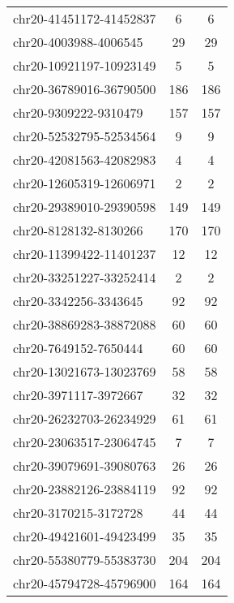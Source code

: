 \begin{longtable}{lSS}
	chr20-41451172-41452837 & 6      & 6                           \\
	chr20-4003988-4006545   & 29     & 29                          \\
	chr20-10921197-10923149 & 5      & 5                           \\
	chr20-36789016-36790500 & 186    & 186                         \\
	chr20-9309222-9310479   & 157    & 157                         \\
	chr20-52532795-52534564 & 9      & 9                           \\
	chr20-42081563-42082983 & 4      & 4                           \\
	chr20-12605319-12606971 & 2      & 2                           \\
	chr20-29389010-29390598 & 149    & 149                         \\
	chr20-8128132-8130266   & 170    & 170                         \\
	chr20-11399422-11401237 & 12     & 12                          \\
	chr20-33251227-33252414 & 2      & 2                           \\
	chr20-3342256-3343645   & 92     & 92                          \\
	chr20-38869283-38872088 & 60     & 60                          \\
	chr20-7649152-7650444   & 60     & 60                          \\
	chr20-13021673-13023769 & 58     & 58                          \\
	chr20-3971117-3972667   & 32     & 32                          \\
	chr20-26232703-26234929 & 61     & 61                          \\
	chr20-23063517-23064745 & 7      & 7                           \\
	chr20-39079691-39080763 & 26     & 26                          \\
	chr20-23882126-23884119 & 92     & 92                          \\
	chr20-3170215-3172728   & 44     & 44                          \\
	chr20-49421601-49423499 & 35     & 35                          \\
	chr20-55380779-55383730 & 204    & 204                         \\
	chr20-45794728-45796900 & 164    & 164                         \\

\end{longtable}
